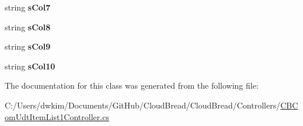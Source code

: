 \begin{DoxyCompactItemize}
\item 
string {\bfseries s\+Col7}\hypertarget{a00094_a76486b94a72b7d1e02609a2dbcbc4740}{}\label{a00094_a76486b94a72b7d1e02609a2dbcbc4740}

\item 
string {\bfseries s\+Col8}\hypertarget{a00094_a81367fc2cfa35393431a666c0eff8929}{}\label{a00094_a81367fc2cfa35393431a666c0eff8929}

\item 
string {\bfseries s\+Col9}\hypertarget{a00094_aa5aaa83b201c704a476f95744d9e3cda}{}\label{a00094_aa5aaa83b201c704a476f95744d9e3cda}

\item 
string {\bfseries s\+Col10}\hypertarget{a00094_aae0c9304e695b4a77f16e29cfc938568}{}\label{a00094_aae0c9304e695b4a77f16e29cfc938568}

\end{DoxyCompactItemize}


The documentation for this class was generated from the following file\+:\begin{DoxyCompactItemize}
\item 
C\+:/\+Users/dwkim/\+Documents/\+Git\+Hub/\+Cloud\+Bread/\+Cloud\+Bread/\+Controllers/\hyperlink{a00208}{C\+B\+Com\+Udt\+Item\+List1\+Controller.\+cs}\end{DoxyCompactItemize}
